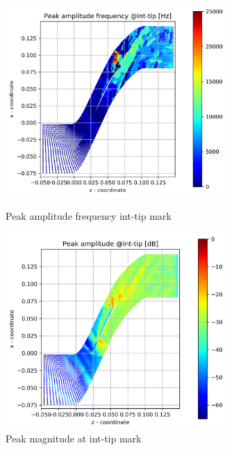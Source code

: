 \begin{figure}[ht]
  \centering
  \includegraphics[width=0.75\textwidth]{Figures/int-tip-peak-freq.png}
  \caption{Peak amplitude frequency int-tip mark} \label{int-tip-peak-freq}
  
  \vspace*{\floatsep}%

  \includegraphics[width=0.75\textwidth]{Figures/int-tip-peak-mag.png}
  \caption{Peak magnitude at int-tip mark} \label{int-tip-peak-mag}
\end{figure}